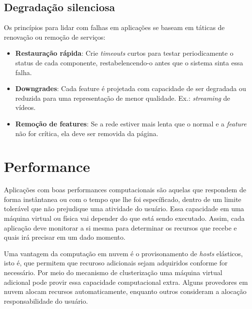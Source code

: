 	\subsection{Degradação silenciosa}
 	Os princípios para lidar com falhas em aplicações se baseam em táticas de renovação ou remoção de serviços:
	
	\begin{itemize}
	\item
	\textbf{Restauração rápida}:
	Crie \textit{timeouts} curtos para testar periodicamente o status de cada componente, restabelencendo-o antes que o sistema sinta essa falha.

	\item
	\textbf{Downgrades}:
	Cada feature é projetada com capacidade de ser degradada ou reduzida para uma representação de menor qualidade. Ex.: \textit{streaming} de vídeos.

	\item
	\textbf{Remoção de features}:
	Se a rede estiver mais lenta que o normal e a \textit{feature} não for crítica, ela deve ser removida da página.

	\end{itemize}
	\iffalse
	\subsection{Exemplo: Netflix's Simian Army}

	\subsection{Exemplo: Skype Reverse NAT}
	\fi


\section{Performance}

Aplicações com boas performances computacionais são aquelas que respondem de forma instântanea ou com o tempo que lhe foi específicado, dentro de um limite tolerável que não prejudique uma atividade do usuário. Essa capacidade em uma máquina virtual ou física vai depender do que está sendo executado. Assim, cada aplicação deve monitorar a si mesma para determinar os recursos que recebe e quais irá precisar em um dado momento.

Uma vantagem da computação em nuvem é o provisonamento de \textit{hosts} elásticos, isto é, que permitem que recuroso adicionais sejam adquiridos conforme for necessário. Por meio do mecanismo de clusterização uma máquina virtual adicional pode provir essa capacidade computacional extra. Alguns provedores em nuvem alocam recursos automaticamente, enquanto outros consideram a alocação responsabilidade do usuário.

